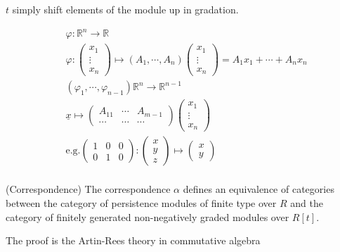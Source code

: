 \documentclass[11pt,a4paper]{report}
\begin{document}
              $t$ simply shift elements of the module up in gradation.

            \begin{Ex}

              \begin{align*}
                &\varphi: \mathbb{R}^n \rightarrow \mathbb{R}\\
                &\varphi: \begin{pmatrix}x_1\\\vdots\\x_n\end{pmatrix} \mapsto (A_1, \cdots, A_n)\begin{pmatrix}x_1\\\vdots\\x_n\end{pmatrix} = A_1x_1 + \cdots + A_nx_n\\
                &(\varphi_1, \cdots, \varphi_{n-1}) \mathbb{R}^n \rightarrow \mathbb{R}^{n-1}\\
                &\underline{x} \mapsto \begin{pmatrix}A_{11} & \cdots & A_{m-1}\\ \cdots&\cdots&\cdots\end{pmatrix}\begin{pmatrix}x_1\\\vdots\\x_n\end{pmatrix}\\
                &\textrm{e.g.} \begin{pmatrix}1&0&0\\0&1&0\end{pmatrix}:\begin{pmatrix}x\\y\\z\end{pmatrix} \mapsto \begin{pmatrix}x\\y\end{pmatrix}\\
              \end{align*}

            \end{Ex}


              \begin{thm} (Correspondence) The correspondence $\alpha$ defines an equivalence of categories between the category of persistence modules of finite type over $R$ and the category of finitely generated non-negatively graded modules over $R[t]$.
              \end{thm}
              The proof is the Artin-Rees theory in commutative algebra \cite{Eisenbud_1995}
\end{document}
